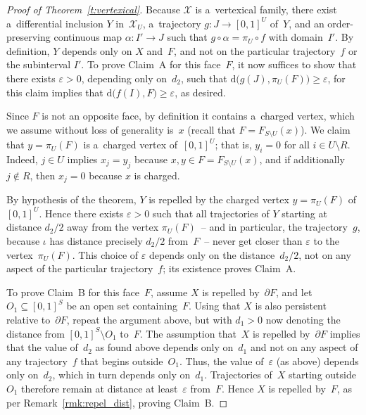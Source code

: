 \begin{proof}[Proof of Theorem~\ref{t:vertexical}]
Because $\mathcal X$ is a~vertexical family, there exist a~dif\/ferential inclusion $Y$ in~$\mathcal X_U$, a~trajectory
$g:J\to[0,1]^U$ of~$Y$, and an order-preserving continuous map $\alpha:I'\to J$ such that $g\circ\alpha=\pi_U\circ f$
with domain~$I'$.
By def\/inition, $Y$ depends only on $X$ and~$F$, and not on the particular trajectory~$f$ or the subinterval $I'$.
To prove Claim~A for this face~$F$, it now suf\/f\/ices to show that there exists $\varepsilon>0$, depending only
on~$d_2$, such that $\mathrm{d}\big(g(J),\pi_U(F)\big)\geq\varepsilon$, for this claim implies that
$\mathrm{d}\big(f(I),F\big)\geq\varepsilon$, as desired.

Since $F$ is not an opposite face, by def\/inition it contains a~charged vertex, which we assume without loss of
generality is~$x$ (recall that $F=F_{S\setminus U}(x)$).
We claim that $y=\pi_U(F)$ is a~charged vertex of~$[0,1]^U$; that is, $y_i=0$ for all $i\in U\setminus R$.
Indeed, $j\in U$ implies $x_j=y_j$ because $x,y\in F=F_{S\setminus U}(x)$, and if additionally $j\notin R$, then
$x_j=0$ because $x$ is charged.

By hypothesis of the theorem, $Y$ is repelled by the charged vertex $y=\pi_U(F)$ of~$[0,1]^U$.
Hence there exists $\varepsilon>0$ such that all trajectories of $Y$ starting at distance $d_2/2$ away from the vertex
$\pi_U(F)$~-- and in particular, the trajectory~$g$, because $\iota$ has distance precisely $d_2/2$ from~$F$~-- never get
closer than $\varepsilon$ to the vertex~$\pi_U(F)$.
This choice of $\varepsilon$ depends only on the distance~$d_2/2$, not on any aspect of the particular trajectory~$f$;
its existence proves Claim~A.

To prove Claim~B for this face~$F$, assume $X$ is repelled by~$\partial F$, and let $O_1\subseteq[0,1]^S$ be an open
set containing~$F$.
Using that $X$ is also persistent relative to~$\partial F$, repeat the argument above, but with $d_1>0$ now denoting
the distance from $[0,1]^S\setminus O_1$ to~$F$.
The assumption that~$X$ is repelled by~$\partial F$ implies that the value of~$d_2$ as found above depends only
on~$d_1$ and not on any aspect of any trajectory~$f$ that begins outside~$O_1$.
Thus, the value of~$\varepsilon$ (as above) depends only on~$d_2$, which in turn depends only on~$d_1$.
Trajectories of~$X$ starting outside~$O_1$ therefore remain at distance at least~$\varepsilon$ from~$F$.
Hence $X$ is repelled by~$F$, as per Remark~\ref{rmk:repel_dist}, proving Claim~B.
\end{proof}
